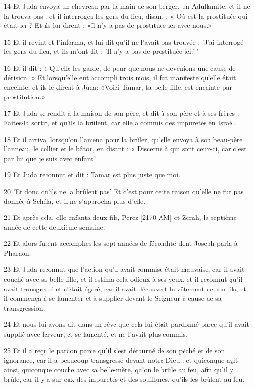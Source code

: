 \par 14 Et Juda envoya un chevreau par la main de son berger, un Adullamite, et il ne la trouva pas ; et il interrogea les gens du lieu, disant : « Où est la prostituée qui était ici ? Et ils lui dirent : «Il n'y a pas de prostituée ici avec nous.»
\par 15 Et il revint et l'informa, et lui dit qu'il ne l'avait pas trouvée : 'J'ai interrogé les gens du lieu, et ils m'ont dit : 'Il n'y a pas de prostituée ici.' '
\par 16 Et il dit : « Qu'elle les garde, de peur que nous ne devenions une cause de dérision. » Et lorsqu'elle eut accompli trois mois, il fut manifeste qu'elle était enceinte, et ils le dirent à Juda: «Voici Tamar, ta belle-fille, est enceinte par prostitution.»
\par 17 Et Juda se rendit à la maison de son père, et dit à son père et à ses frères : Faites-la sortir, et qu'ils la brûlent, car elle a commis des impuretés en Israël.
\par 18 Et il arriva, lorsqu'on l'amena pour la brûler, qu'elle envoya à son beau-père l'anneau, le collier et le bâton, en disant : « Discerne à qui sont ceux-ci, car c'est par lui que je suis avec enfant.'
\par 19 Et Juda reconnut et dit : Tamar est plus juste que moi.
\par 20 'Et donc qu'ils ne la brûlent pas' Et c'est pour cette raison qu'elle ne fut pas donnée à Schéla, et il ne s'approcha plus d'elle.
\par 21 Et après cela, elle enfanta deux fils, Perez [2170 AM] et Zerah, la septième année de cette deuxième semaine.
\par 22 Et alors furent accomplies les sept années de fécondité dont Joseph parla à Pharaon.
\par 23 Et Juda reconnut que l'action qu'il avait commise était mauvaise, car il avait couché avec sa belle-fille, et il estima cela odieux à ses yeux, et il reconnut qu'il avait transgressé et s'était égaré, car il avait découvert le vêtement de son fils, et il commença à se lamenter et à supplier devant le Seigneur à cause de sa transgression.
\par 24 Et nous lui avons dit dans un rêve que cela lui était pardonné parce qu'il avait supplié avec ferveur, et se lamenté, et ne l'avait plus commis.
\par 25 Et il a reçu le pardon parce qu'il s'est détourné de son péché et de son ignorance, car il a beaucoup transgressé devant notre Dieu ; et quiconque agit ainsi, quiconque couche avec sa belle-mère, qu'on le brûle au feu, afin qu'il y brûle, car il y a sur eux des impuretés et des souillures, qu'ils les brûlent au feu.
